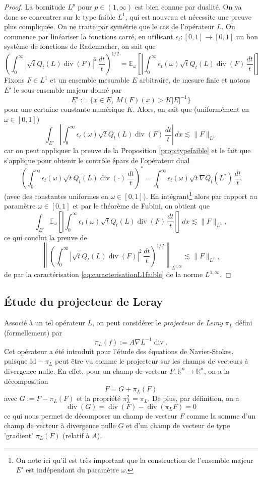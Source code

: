 \documentclass[11pt]{amsart}
\DeclareMathOperator{\dive}{div}
\newcommand{\rr}{\mathbb}
\newcommand\E{\mathbb{E}}
\begin{document}
\begin{proof} La bornitude $L^p$ pour $p\in(1,\infty)$ est bien connue par dualit\'e. On va donc se concentrer sur le type faible $L^1$, qui est nouveau et n\'ecessite une preuve plus compliqu\'ee. On ne traite par sym\'etrie que le cas de l'op\'erateur $L$. On commence par lin\'eariser la fonctions carr\'e, en utilisant $\epsilon_t:[0,1] \to [0,1]$ un bon syst\`eme de fonctions de Rademacher, on sait que
$$ \left(\int_0^\infty \left| \sqrt{t} Q_t(L) \dive(F)  \right|^2 \, \frac{dt}{t} \right)^{1/2} 
= \E_\omega\left[ \left|\int_0^\infty \epsilon_t(\omega) \sqrt{t} Q_t(L) \dive(F) \, \frac{dt}{t} \right| \right]$$
Fixons $F\in L^1$ et un ensemble mesurable $E$ arbitraire, de mesure finie et notons $E'$ le sous-ensemble majeur donn\'e par
$$ E':=\{x\in E,\ M(F)(x)>K|E|^{-1} \}
$$
pour une certaine constante num\'erique $K$.
Alors, on sait que (uniform\'ement en $\omega\in[0,1]$)
$$ \int_{E'} \left|\int_0^\infty \epsilon_t(\omega) \sqrt{t} Q_t(L) \dive(F) \, \frac{dt}{t}\right|\, dx \lesssim \|F\|_{L^1}$$
car on peut appliquer la preuve de la Proposition \ref{prop:typefaible} et le fait que \cite{BernicotFreyPetermichl} s'applique pour obtenir le contr\^ole \'epars de l'op\'erateur dual
$$ \left(\int_0^\infty \epsilon_t(\omega) \sqrt{t} Q_t(L) \dive(\cdot) \, \frac{dt}{t}\right)^{*} = \int_0^\infty \epsilon_t(\omega) \sqrt{t} \nabla Q_t(L^*)  \, \frac{dt}{t}$$
(avec des constantes uniformes en $\omega\in[0,1]$).
En int\'egrant\footnote{On note ici qu'il est tr\`es important que la construction de l'ensemble majeur $E'$ est ind\'ependant du param\`etre $\omega$.} alors par rapport au param\`etre $\omega\in[0,1]$ et par le th\'eor\`eme de Fubini, on obtient que 
$$ \int_{E'} \E_\omega\left[ \left|\int_0^\infty \epsilon_t(\omega) \sqrt{t} Q_t(L) \dive(F) \, \frac{dt}{t} \right| \right] \, dx \lesssim \|F\|_{L^1}, $$
ce qui conclut la preuve de 
$$ \left\| \left(\int_0^\infty \left| \sqrt{t} Q_t(L) \dive(F)  \right|^2 \, \frac{dt}{t} \right)^{1/2} \right\|_{L^{1,\infty}} \lesssim \|F\|_{L^1},$$
de par la caract\'erisation \eqref{eq:caracterisationL1faible} de la norme $L^{1,\infty}$.
\end{proof}


\subsection{\'Etude du projecteur de Leray}

Associ\'e \`a un tel op\'erateur $L$, on peut consid\'erer le {\it projecteur de Leray} $\pi_L$ d\'efini (formellement) par
$$ \pi_L(f) := A \nabla L^{-1} \dive.$$
Cet op\'erateur a \'et\'e introduit pour l'\'etude des \'equations de Navier-Stokes, puisque $\textrm{Id}-\pi_L$ peut \^etre vu comme le projecteur sur les champs de vecteurs \`a divergence nulle. En effet, pour un champ de vecteur $F:{\rr R}^n \rightarrow {\rr R}^n$, on a la d\'ecomposition
$$ F = G+\pi_L(F)$$
avec $G:=F-\pi_L(F)$ et la propri\'et\'e $\pi_L^2=\pi_L$. De plus, par d\'efinition, on a 
$$\dive(G) = \dive(F) - \dive(\pi_L F) =0$$ 
ce qui nous permet de d\'ecomposer un champ de vecteur $F$ comme la somme d'un champ de vecteur \`a divergence nulle $G$ et d'un champ de vecteur de type 'gradient' $\pi_L(F)$ (relatif \`a $A$).
\end{document}
